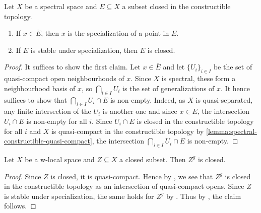 \begin{lemma}[\stacksproject{0903}]
    \label{lemma:spectral-constructible-closed-closed}
    Let $X$ be a spectral space and $E \subseteq X$ a subset closed in the constructible topology.
    \begin{enumerate}
        \item If $x \in \overline{E}$, then $x$ is the specialization of a point in $E$.
        \item If $E$ is stable under specialization, then $E$ is closed. \label{item:specialization-closed-spectral-constructible-closed-closed}
    \end{enumerate}
    \leanok
\end{lemma}

\begin{proof}
    It suffices to show the first claim. Let $x \in \overline{E}$
    and let $\{U_i\}_{i \in I}$ be the set of quasi-compact open neighbourhoods of $x$.
    Since $X$ is spectral, these form a neighbourhood basis of $x$, so $\bigcap_{i \in  I} U_i$
    is the set of generalizations of $x$. It hence suffices to show
    that $\bigcap_{i \in  I} U_i \cap E$ is non-empty. Indeed,
    as $X$ is quasi-separated, any finite intersection of the $U_i$ is another one and
    since $x \in \overline{E}$, the intersection $U_i \cap E$ is non-empty for all $i$.
    Since $U_i \cap E$ is closed in the constructible topology for all $i$
    and $X$ is quasi-compact in the constructible topology by \ref{lemma:spectral-constructible-quasi-compact},
    the intersection $\bigcap_{i \in  I} U_i \cap E$ is non-empty.
\end{proof}

\begin{lemma}
    Let $X$ be a w-local space and $Z \subseteq X$ a closed subset. Then $Z^g$ is closed.
    \label{lemma:w-local-generalization-closed-closed}
    \leanok
\end{lemma}

\begin{proof}
    Since $Z$ is closed, it is quasi-compact. Hence by ,
    we see that $Z^g$ is closed in the constructible topology as an intersection of quasi-compact opens.
    Since $Z$ is stable under specialization, the same holds for $Z^g$ by
    . Thus
    by , the claim follows.
\end{proof}

